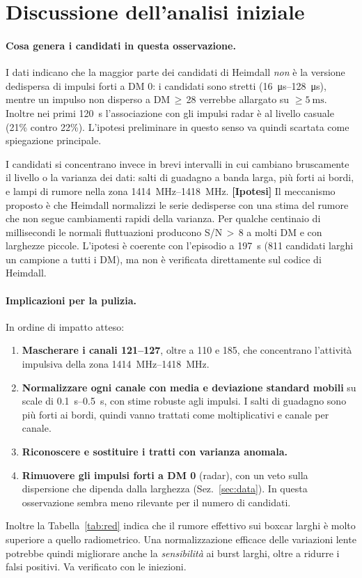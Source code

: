 \documentclass[11pt,a4paper]{article}
\newcommand{\ipotesi}[1]{\textcolor{orange!70!black}{\textbf{[Ipotesi]}} #1}
\begin{document}
\FloatBarrier
\section{Discussione dell'analisi iniziale}
\label{sec:discussion}

\paragraph{Cosa genera i candidati in questa osservazione.} I dati indicano che la maggior parte dei candidati di
Heimdall \emph{non} è la versione dedispersa di impulsi forti a DM 0: i candidati sono stretti
(\SIrange{16}{128}{\micro\second}), mentre un impulso non disperso a DM\,$\geq$\,28 verrebbe allargato su
$\geq\SI{5}{\milli\second}$. Inoltre nei primi \SI{120}{\second} l'associazione con gli impulsi radar è al livello
casuale (21\% contro 22\%). L'ipotesi preliminare in questo senso va quindi scartata come spiegazione principale.

I candidati si concentrano invece in brevi intervalli in cui cambiano bruscamente il livello o la varianza dei dati:
salti di guadagno a banda larga, più forti ai bordi, e lampi di rumore nella zona
\SIrange{1414}{1418}{\mega\hertz}.
\ipotesi{Il meccanismo proposto è che Heimdall normalizzi le serie dedisperse con una stima del rumore che non segue
cambiamenti rapidi della varianza. Per qualche centinaio di millisecondi le normali fluttuazioni producono S/N\,$>$\,8
a molti DM e con larghezze piccole.} L'ipotesi è coerente con l'episodio a \SI{197}{\second} (811 candidati larghi
un campione a tutti i DM), ma non è verificata direttamente sul codice di Heimdall.

\paragraph{Implicazioni per la pulizia.} In ordine di impatto atteso:
\begin{enumerate}
  \item \textbf{Mascherare i canali 121--127}, oltre a 110 e 185, che concentrano l'attività impulsiva della zona
    \SIrange{1414}{1418}{\mega\hertz}.
  \item \textbf{Normalizzare ogni canale con media e deviazione standard mobili} su scale di
    \SIrange{0.1}{0.5}{\second}, con stime robuste agli impulsi. I salti di guadagno sono più forti ai bordi, quindi
    vanno trattati come moltiplicativi e canale per canale.
  \item \textbf{Riconoscere e sostituire i tratti con varianza anomala.}
  \item \textbf{Rimuovere gli impulsi forti a DM 0} (radar), con un veto sulla dispersione che dipenda dalla larghezza
    (Sez.~\ref{sec:data}). In questa osservazione sembra meno rilevante per il numero di candidati.
\end{enumerate}
Inoltre la Tabella~\ref{tab:red} indica che il rumore effettivo sui boxcar larghi è molto superiore a quello
radiometrico. Una normalizzazione efficace delle variazioni lente potrebbe quindi migliorare anche la
\emph{sensibilità} ai burst larghi, oltre a ridurre i falsi positivi. Va verificato con le iniezioni.
\end{document}
